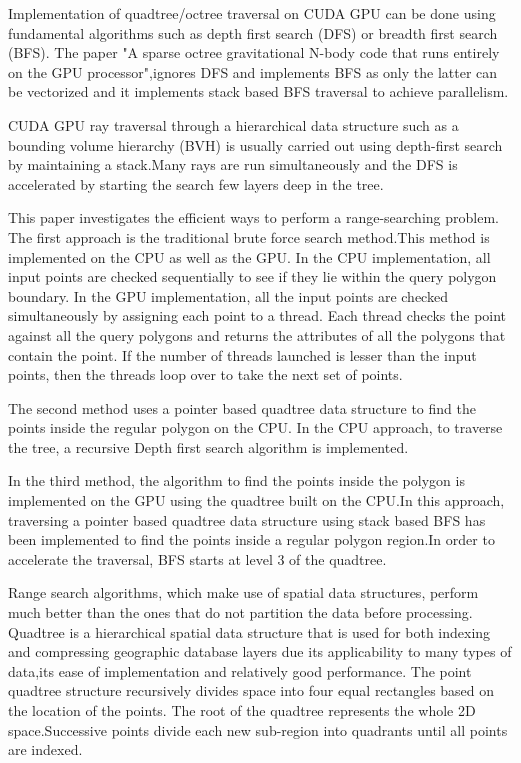 \documentclass{article}
\begin{document}
Implementation of quadtree/octree traversal on CUDA GPU can be done using fundamental algorithms such as  depth first search (DFS) or breadth first search (BFS). 
The paper "A sparse octree gravitational N-body code that runs entirely on the GPU processor",ignores DFS and implements  BFS as only the latter can be vectorized and it implements stack based BFS traversal to achieve parallelism.

CUDA GPU ray traversal through a hierarchical data structure such as a bounding volume hierarchy (BVH) is usually carried out using depth-first search  by maintaining a stack.Many rays are run simultaneously and the DFS is accelerated by starting the search few layers deep in the tree.

This paper investigates the efficient ways to perform a range-searching problem.
The first approach is the traditional brute force search method.This method is implemented on the CPU as well as the GPU. In the CPU implementation, all input points are checked  sequentially to see if they lie within the query polygon boundary. In the GPU implementation, all the input points are checked simultaneously by assigning each point to a thread. Each thread checks the point against all the query polygons and returns the attributes of all the polygons that contain the point. If the number of threads launched is lesser than the input points, then the threads loop over to take the next set of points.

The second method uses a pointer based quadtree data structure to find the points inside the regular polygon on the CPU. In the CPU approach, to traverse the tree, a recursive Depth first search algorithm is implemented.

In the third method, the algorithm to find the points inside the polygon is implemented on the GPU  using the quadtree built on the CPU.In this approach, traversing a pointer based quadtree data structure using stack based BFS has been implemented to find the points inside a regular polygon region.In order to accelerate the traversal, BFS starts at level 3 of the quadtree.

Range search algorithms, which make use of spatial data structures, perform much better than the ones that do not partition the data before processing. Quadtree is a hierarchical spatial data structure that is used for both indexing and compressing geographic database layers due its applicability to many types of data,its ease of implementation and relatively good performance. The point quadtree structure recursively divides space into four equal rectangles based on the location of the points. The root of the quadtree represents the whole 2D space.Successive points divide each new sub-region into quadrants until all points are indexed.
\end{document}
